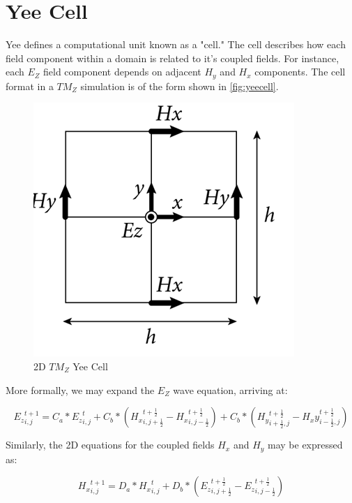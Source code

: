 \section{Yee Cell}

Yee \cite{Yee} defines a computational unit known as a "cell." The cell describes how each field component within a domain is related to it's coupled fields. For instance, each $E_Z$ field component depends on adjacent $H_y$ and $H_x$ components. The cell format in a $TM_Z$ simulation is of the form shown in \autoref{fig:yeecell}.

\begin{figure}[H]
	\centering
	\includegraphics{yee-cell-ez.png}
	\caption{2D $TM_Z$ Yee Cell}
	\label{fig:yeecell}
\end{figure}

More formally, we may expand the $E_Z$ wave equation, arriving at:

\begin{equation} \label{eq:ezupdate}
{E_z}_{i,j}^{t+1} = C_a * {E_z}_{i,j}^{t} 
+ C_b * ({H_x}_{i,j+\frac{1}{2}}^{t+\frac{1}{2}} - {H_x}_{i,j-\frac{1}{2}}^{t+\frac{1}{2}})
+ C_b * ({H_y}_{i+\frac{1}{2},j}^{t+\frac{1}{2}} - {H_xy}_{i-\frac{1}{2},j}^{t+\frac{1}{2}})
\end{equation}

Similarly, the 2D equations for the coupled fields $H_x$ and $H_y$ may be expressed as:

\begin{equation} \label{eq:hxupdate}
{H_x}_{i,j}^{t+1} = D_a * {H_x}_{i,j}^{t} + D_b * (
{E_z}_{i,j+\frac{1}{2}}^{t+\frac{1}{2}} 
-
{E_z}_{i,j-\frac{1}{2}}^{t+\frac{1}{2}}
)  
\end{equation}

